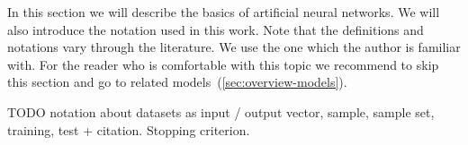 
\newcommand{\argmin}{\operatornamewithlimits{arg\,min}}
\newcommand{\Bx}{{\bf x}}
\newcommand{\By}{{\bf y}}
\newcommand{\Bh}{{\bf h}}
\newcommand{\Bw}{{\bf w}}
\newcommand{\Bc}{{\bf c}}

In this section we will describe the basics of artificial neural networks. We will also introduce the notation used in this work. Note that the definitions and notations vary through the literature. We use the one which the author is familiar with. For the reader who is comfortable with this topic we recommend to skip this section and go to related models~(\ref{sec:overview-models}). 

TODO notation about datasets as input / output vector, sample, sample set, training, test + citation. Stopping criterion. 

 
\label{sec:perceptron} 



 

 
